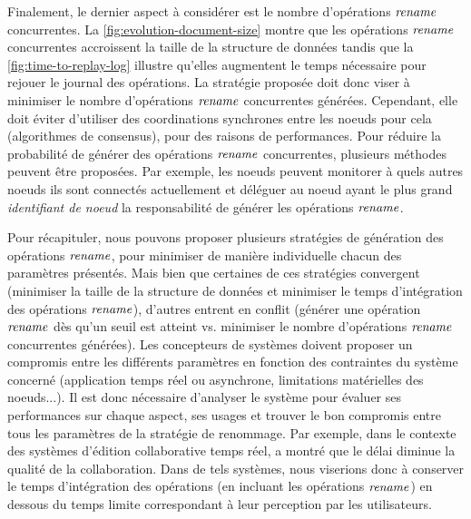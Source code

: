 Finalement, le dernier aspect à considérer est le nombre d'opérations $\mathit{rename}$ concurrentes.
La \autoref{fig:evolution-document-size} montre que les opérations $\mathit{rename}$ concurrentes accroissent la taille de la structure de données tandis que la \autoref{fig:time-to-replay-log} illustre qu'elles augmentent le temps nécessaire pour rejouer le journal des opérations.
La stratégie proposée doit donc viser à minimiser le nombre d'opérations $\mathit{rename}$ concurrentes générées.
Cependant, elle doit éviter d'utiliser des coordinations synchrones entre les noeuds pour cela (\eg algorithmes de consensus), pour des raisons de performances.
Pour réduire la probabilité de générer des opérations $\mathit{rename}$ concurrentes, plusieurs méthodes peuvent être proposées.
Par exemple, les noeuds peuvent monitorer à quels autres noeuds ils sont connectés actuellement et déléguer au noeud ayant le plus grand \emph{identifiant de noeud} la responsabilité de générer les opérations $\mathit{rename}$.

Pour récapituler, nous pouvons proposer plusieurs stratégies de génération des opérations $\mathit{rename}$, pour minimiser de manière individuelle chacun des paramètres présentés.
Mais bien que certaines de ces stratégies convergent (minimiser la taille de la structure de données et minimiser le temps d'intégration des opérations $\mathit{rename}$), d'autres entrent en conflit (générer une opération $\mathit{rename}$ dès qu'un seuil est atteint vs. minimiser le nombre d'opérations $\mathit{rename}$ concurrentes générées).
Les concepteurs de systèmes doivent proposer un compromis entre les différents paramètres en fonction des contraintes du système concerné (application temps réel ou asynchrone, limitations matérielles des noeuds...).
Il est donc nécessaire d'analyser le système pour évaluer ses performances sur chaque aspect, ses usages et trouver le bon compromis entre tous les paramètres de la stratégie de renommage.
Par exemple, dans le contexte des systèmes d'édition collaborative temps réel, \cite{2014-effect-delay-collaborative-editing-ignat} a montré que le délai diminue la qualité de la collaboration.
Dans de tels systèmes, nous viserions donc à conserver le temps d'intégration des opérations (en incluant les opérations $\mathit{rename}$) en dessous du temps limite correspondant à leur perception par les utilisateurs.
